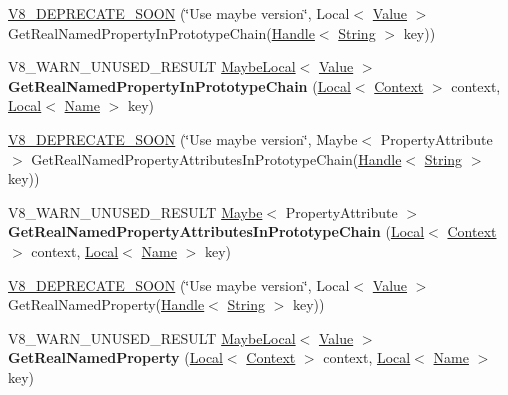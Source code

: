 \begin{DoxyCompactItemize}
\item 
\hyperlink{classv8_1_1_object_a460bc946075391bd304de73c438f0c34}{V8\+\_\+\+D\+E\+P\+R\+E\+C\+A\+T\+E\+\_\+\+S\+O\+O\+N} (\char`\"{}Use maybe version\char`\"{}, Local$<$ \hyperlink{classv8_1_1_value}{Value} $>$ Get\+Real\+Named\+Property\+In\+Prototype\+Chain(\hyperlink{classv8_1_1_local}{Handle}$<$ \hyperlink{classv8_1_1_string}{String} $>$ key))
\item 
\hypertarget{classv8_1_1_object_afe68d490fc41783e30126ca547b7fc90}{}V8\+\_\+\+W\+A\+R\+N\+\_\+\+U\+N\+U\+S\+E\+D\+\_\+\+R\+E\+S\+U\+L\+T \hyperlink{classv8_1_1_maybe_local}{Maybe\+Local}$<$ \hyperlink{classv8_1_1_value}{Value} $>$ {\bfseries Get\+Real\+Named\+Property\+In\+Prototype\+Chain} (\hyperlink{classv8_1_1_local}{Local}$<$ \hyperlink{classv8_1_1_context}{Context} $>$ context, \hyperlink{classv8_1_1_local}{Local}$<$ \hyperlink{classv8_1_1_name}{Name} $>$ key)\label{classv8_1_1_object_afe68d490fc41783e30126ca547b7fc90}

\item 
\hyperlink{classv8_1_1_object_ad1d9bafc8a997ca6a2ea79fe8bcef073}{V8\+\_\+\+D\+E\+P\+R\+E\+C\+A\+T\+E\+\_\+\+S\+O\+O\+N} (\char`\"{}Use maybe version\char`\"{}, Maybe$<$ Property\+Attribute $>$ Get\+Real\+Named\+Property\+Attributes\+In\+Prototype\+Chain(\hyperlink{classv8_1_1_local}{Handle}$<$ \hyperlink{classv8_1_1_string}{String} $>$ key))
\item 
\hypertarget{classv8_1_1_object_aab7c2e5c5659e95e97488e01b04bf3c8}{}V8\+\_\+\+W\+A\+R\+N\+\_\+\+U\+N\+U\+S\+E\+D\+\_\+\+R\+E\+S\+U\+L\+T \hyperlink{classv8_1_1_maybe}{Maybe}$<$ Property\+Attribute $>$ {\bfseries Get\+Real\+Named\+Property\+Attributes\+In\+Prototype\+Chain} (\hyperlink{classv8_1_1_local}{Local}$<$ \hyperlink{classv8_1_1_context}{Context} $>$ context, \hyperlink{classv8_1_1_local}{Local}$<$ \hyperlink{classv8_1_1_name}{Name} $>$ key)\label{classv8_1_1_object_aab7c2e5c5659e95e97488e01b04bf3c8}

\item 
\hyperlink{classv8_1_1_object_a8a26378c1f6d244d2d8e4e8cea9b71cb}{V8\+\_\+\+D\+E\+P\+R\+E\+C\+A\+T\+E\+\_\+\+S\+O\+O\+N} (\char`\"{}Use maybe version\char`\"{}, Local$<$ \hyperlink{classv8_1_1_value}{Value} $>$ Get\+Real\+Named\+Property(\hyperlink{classv8_1_1_local}{Handle}$<$ \hyperlink{classv8_1_1_string}{String} $>$ key))
\item 
\hypertarget{classv8_1_1_object_aecec39cefb3e394e1696fe618862efec}{}V8\+\_\+\+W\+A\+R\+N\+\_\+\+U\+N\+U\+S\+E\+D\+\_\+\+R\+E\+S\+U\+L\+T \hyperlink{classv8_1_1_maybe_local}{Maybe\+Local}$<$ \hyperlink{classv8_1_1_value}{Value} $>$ {\bfseries Get\+Real\+Named\+Property} (\hyperlink{classv8_1_1_local}{Local}$<$ \hyperlink{classv8_1_1_context}{Context} $>$ context, \hyperlink{classv8_1_1_local}{Local}$<$ \hyperlink{classv8_1_1_name}{Name} $>$ key)\label{classv8_1_1_object_aecec39cefb3e394e1696fe618862efec}


\end{DoxyCompactItemize}
